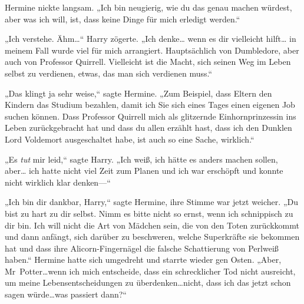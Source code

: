 Hermine nickte langsam. „Ich bin neugierig, wie du das genau machen würdest, aber was ich will, ist, dass keine Dinge für mich erledigt werden.“

„Ich verstehe. Ähm…“ Harry zögerte. „Ich denke… wenn es dir vielleicht hilft… in meinem Fall wurde viel für mich arrangiert. Hauptsächlich von Dumbledore, aber auch von Professor Quirrell. Vielleicht ist die Macht, sich seinen Weg im Leben selbst zu verdienen, etwas, das man sich verdienen muss.“

„Das klingt ja sehr weise,“ sagte Hermine. „Zum Beispiel, dass Eltern den Kindern das Studium bezahlen, damit ich Sie sich eines Tages einen eigenen Job suchen können. Dass Professor Quirrell mich als glitzernde Einhornprinzessin ins Leben zurückgebracht hat und dass du allen erzählt hast, dass ich den Dunklen Lord Voldemort ausgeschaltet habe, ist auch so eine Sache, wirklich.“

„Es \emph{tut} mir leid,“ sagte Harry. „Ich weiß, ich hätte es anders machen sollen, aber… ich hatte nicht viel Zeit zum Planen und ich war erschöpft und konnte nicht wirklich klar denken—“

„Ich bin dir dankbar, Harry,“ sagte Hermine, ihre Stimme war jetzt weicher. „Du bist zu hart zu dir selbst. Nimm es bitte nicht so ernst, wenn ich schnippisch zu dir bin. Ich will nicht die Art von Mädchen sein, die von den Toten zurückkommt und dann anfängt, sich darüber zu beschweren, welche Superkräfte sie bekommen hat und dass ihre Alicorn-Fingernägel die falsche Schattierung von Perlweiß haben.“ Hermine hatte sich umgedreht und starrte wieder gen Osten. „Aber, Mr~Potter…wenn ich mich entscheide, dass ein schrecklicher Tod nicht ausreicht, um meine Lebensentscheidungen zu überdenken…nicht, dass ich das jetzt schon sagen würde…was passiert dann?“

